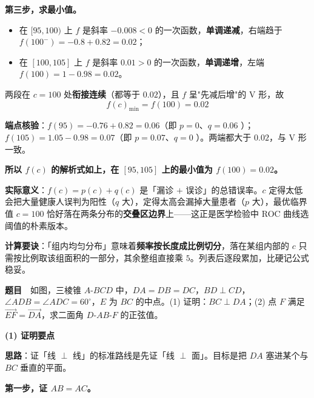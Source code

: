 \textbf{第三步，求最小值。}

\begin{itemize}
\item 在 $[95,100)$ 上 $f$ 是斜率 $-0.008<0$ 的一次函数，\textbf{单调递减}，右端趋于 $f(100^{-})=-0.8+0.82=0.02$；
\item 在 $[100,105]$ 上 $f$ 是斜率 $0.01>0$ 的一次函数，\textbf{单调递增}，左端 $f(100)=1-0.98=0.02$。
\end{itemize}

两段在 $c=100$ 处\textbf{衔接连续}（都等于 $0.02$），且 $f$ 呈"先减后增"的 V 形，故
\[f(c)_{\min}=f(100)=0.02\]

\textbf{端点核验}：$f(95)=-0.76+0.82=0.06$（即 $p=0$、$q=0.06$ ）；$f(105)=1.05-0.98=0.07$（即 $p=0.07$、$q=0$ ）。两端都大于 $0.02$，与 V 形一致。

\textbf{所以 $f(c)$ 的解析式如上，在 $[95,105]$ 上的最小值为 $f(100)=0.02$。}

\begin{gktip}
\textbf{实际意义}：$f(c)=p(c)+q(c)$ 是「漏诊 $+$ 误诊」的总错误率。$c$ 定得太低会把大量健康人误判为阳性（$q$ 大），定得太高会漏掉大量患者（$p$ 大），最优临界值 $c=100$ 恰好落在两条分布的\textbf{交叠区边界}上——这正是医学检验中 ROC 曲线选阈值的朴素版本。

\textbf{计算要诀}：「组内均匀分布」意味着\textbf{频率按长度成比例切分}，落在某组内部的 $c$ 只需按比例取该组面积的一部分，其余整组直接乘 $5$。列表后逐段累加，比硬记公式稳妥。
\end{gktip}

\par\medskip


\textbf{题目}　如图，三棱锥 $A\text{-}BCD$ 中，$DA=DB=DC$，$BD\perp CD$，$\angle ADB=\angle ADC=60^\circ$，$E$ 为 $BC$ 的中点。(1) 证明：$BC\perp DA$；(2) 点 $F$ 满足 $\overrightarrow{EF}=\overrightarrow{DA}$，求二面角 $D\text{-}AB\text{-}F$ 的正弦值。

\begin{center}\end{center}

\par\medskip

\textbf{(1) 证明要点}

\textbf{思路}：证「线 $\perp$ 线」的标准路线是先证「线 $\perp$ 面」。目标是把 $DA$ 塞进某个与 $BC$ 垂直的平面。

\textbf{第一步，证 $AB=AC$。}

